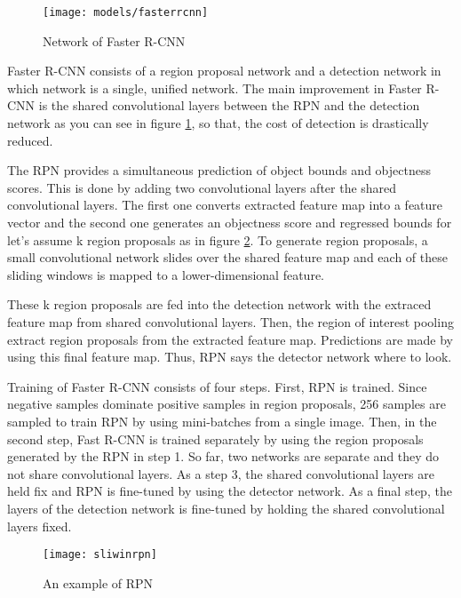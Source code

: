 \documentclass{article}
\begin{document}
\setlength{\parindent}{6ex}

\begin{figure}
    \centering
    \texttt{[image: models/fasterrcnn]}
    \caption{Network of Faster R-CNN}
    \label{fig:fasterrcnn1}
\end{figure}

\indent

Faster R-CNN \cite{fasterrcnncite} consists of a region proposal network and a detection network in which 
network is a single, unified network. 
The main improvement in Faster R-CNN is the shared convolutional layers between 
the RPN and the detection network as you can see in figure \ref{fig:fasterrcnn1}, so that, the cost of 
detection is drastically reduced. \par

The RPN provides a simultaneous prediction of object bounds and 
objectness scores. This is done by adding two convolutional layers after the 
shared convolutional layers. The first one converts extracted feature map into a 
feature vector and the second one generates an objectness score and regressed 
bounds for let's assume k region proposals as in figure \ref{fig:sliwinrpn1}. To 
generate region proposals, a small convolutional network slides over the shared 
feature map and each of these sliding windows is mapped to a lower-dimensional 
feature. \par

These k region proposals are fed into the detection network with the extraced feature 
map from shared convolutional layers. Then, the region of interest pooling extract 
region proposals from the extracted feature map. Predictions are made by using this 
final feature map. Thus, RPN says the detector network where to look. \par

Training of Faster R-CNN consists of four steps. First, RPN is trained. Since 
negative samples dominate positive samples in region proposals, 256 samples are 
sampled to train RPN by using mini-batches from a single image. Then, in the 
second step, Fast R-CNN is trained separately by using the region proposals 
generated by the RPN in step 1. So far, two networks are separate and they do 
not share convolutional layers. As a step 3, the shared convolutional layers are 
held fix and RPN is fine-tuned by using the detector network. As a final step, the 
layers of the detection network is fine-tuned by holding the shared convolutional layers 
fixed.
\begin{figure}
    \centering
    \texttt{[image: sliwinrpn]}
    \caption{An example of RPN}
    \label{fig:sliwinrpn1}
\end{figure}
\end{document}
